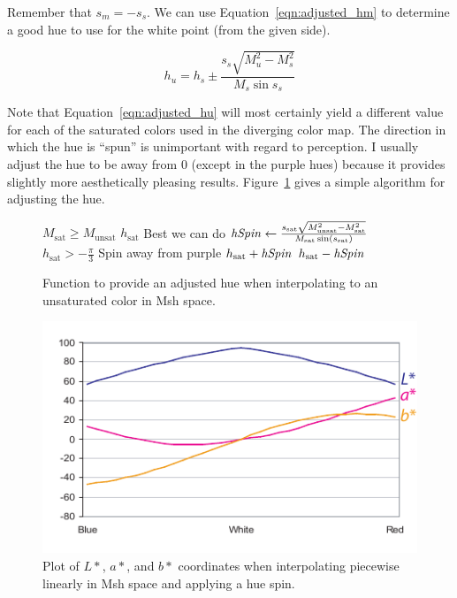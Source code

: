 \documentclass{acmsiggraph}               %
\newcommand{\Msh}{Msh\xspace}
\begin{document}
Remember that $s_m=-s_s$.  We can use Equation~\ref{eqn:adjusted_hm} to
determine a good hue to use for the white point (from the given side).

\begin{equation}
  h_u = h_s \pm \frac{s_s \sqrt{M_u^2 - M_s^2}}{M_s \sin s_s}
  \label{eqn:adjusted_hu}
\end{equation}

Note that Equation~\ref{eqn:adjusted_hu} will most certainly yield a
different value for each of the saturated colors used in the diverging
color map.  The direction in which the hue is ``spun'' is unimportant with
regard to perception.  I usually adjust the hue to be away from 0 (except
in the purple hues) because it provides slightly more aesthetically
pleasing results.  Figure~\ref{fig:AdjustHue} gives a simple algorithm for
adjusting the hue.

\begin{figure}
  \begin{codebox}
    \li \If $M_\mathrm{sat} \geq M_\mathrm{unsat}$
    \li \Then \Return $h_\mathrm{sat}$ \RComment Best we can do
    \li \Else $\id{hSpin} \leftarrow
                 \frac{s_\mathrm{sat}\sqrt{M_\mathrm{unsat}^2-M_\mathrm{sat}^2}}
		      {M_\mathrm{sat} \sin(s_\mathrm{sat})}$
    \li       \If $h_\mathrm{sat} > -\frac{\pi}{3}$ \RComment Spin away from purple
    \li       \Then \Return $h_\mathrm{sat} + \id{hSpin}$
    \li       \Else \Return $h_\mathrm{sat} - \id{hSpin}$
              \End
        \End
  \end{codebox}
  \caption{Function to provide an adjusted hue when interpolating to an
    unsaturated color in \Msh space.}
  \label{fig:AdjustHue}
\end{figure}

\begin{figure}
  \centering
  \includegraphics{images/HueSpinPlot}
  \caption{Plot of $L*$, $a*$, and $b*$ coordinates when interpolating
    piecewise linearly in \Msh space and applying a hue spin.}
  \label{fig:hue_spin_plot}
\end{figure}
\end{document}
